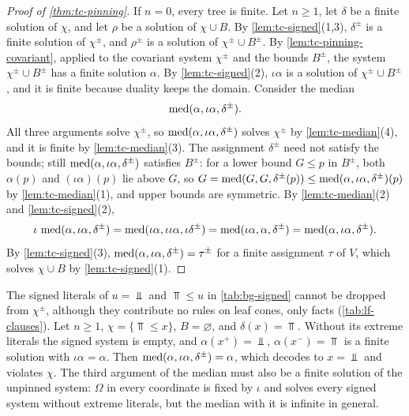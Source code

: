 \begin{proof}[Proof of \cref{thm:tc-pinning}]
If $n=0$, every tree is finite. Let $n\ge1$, let $\delta$ be a finite solution
of $\chi$, and let $\rho$ be a solution of $\chi\cup B$. By
\cref{lem:tc-signed}(1,3), $\delta^\pm$ is a finite solution of $\chi^\pm$,
and $\rho^\pm$ is a solution of $\chi^\pm\cup B^\pm$. By
\cref{lem:tc-pinning-covariant}, applied to the covariant system $\chi^\pm$
and the bounds $B^\pm$, the system $\chi^\pm\cup B^\pm$ has a finite solution
$\alpha$. By \cref{lem:tc-signed}(2), $\iota\alpha$ is a solution of
$\chi^\pm\cup B^\pm$, and it is finite because duality keeps the domain. Consider the
median
\[
 \operatorname{med}(\alpha,\iota\alpha,\delta^\pm).
\]
All three arguments solve $\chi^\pm$, so $\operatorname{med}(\alpha,\iota\alpha,\delta^\pm)$
solves $\chi^\pm$ by \cref{lem:tc-median}(4), and it is finite by
\cref{lem:tc-median}(3). The assignment $\delta^\pm$ need not satisfy the
bounds; still $\operatorname{med}(\alpha,\iota\alpha,\delta^\pm)$ satisfies $B^\pm$: for a
lower bound $G\le p$ in $B^\pm$, both $\alpha(p)$ and $(\iota\alpha)(p)$ lie
above $G$, so
$G=\operatorname{med}(G,G,\delta^\pm(p))\le\operatorname{med}(\alpha,\iota\alpha,\delta^\pm)(p)$ by
\cref{lem:tc-median}(1), and upper bounds are symmetric. By
\cref{lem:tc-median}(2) and \cref{lem:tc-signed}(2),
\[
 \iota\,\operatorname{med}(\alpha,\iota\alpha,\delta^\pm)
 =\operatorname{med}(\iota\alpha,\iota\iota\alpha,\iota\delta^\pm)
 =\operatorname{med}(\iota\alpha,\alpha,\delta^\pm)=\operatorname{med}(\alpha,\iota\alpha,\delta^\pm) .
\]
By \cref{lem:tc-signed}(3), $\operatorname{med}(\alpha,\iota\alpha,\delta^\pm)=\tau^\pm$ for
a finite assignment $\tau$ of $V$, which solves $\chi\cup B$ by \cref{lem:tc-signed}(1).
\end{proof}

\begin{example}\label{rem:tc-extreme}
The signed literals of $u=\Bot$ and $\Top\le u$ in \cref{tab:bg-signed} cannot
be dropped from $\chi^\pm$, although they contribute no rules on leaf cones,
only facts (\cref{tab:lf-clauses}). Let $n\ge1$, $\chi=\{\Top\le x\}$,
$B=\varnothing$, and $\delta(x)=\Top$. Without its extreme literals the signed
system is empty, and $\alpha(x^+)=\Bot$, $\alpha(x^-)=\Top$ is a finite
solution with $\iota\alpha=\alpha$. Then
$\operatorname{med}(\alpha,\iota\alpha,\delta^\pm)=\alpha$, which decodes to $x=\Bot$ and
violates $\chi$. The third argument of the median must also be a finite
solution of the unpinned system: $\Omega$ in every coordinate is fixed by
$\iota$ and solves every signed system without extreme literals, but the
median with it is infinite in general.
\end{example}


